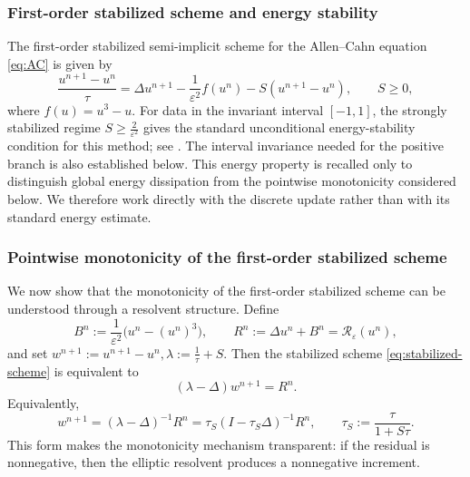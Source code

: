 \documentclass[final, 3p, times]{elsarticle}%
\newcommand{\eps}{\varepsilon}
\newcommand{\Reps}{\mathcal R_\varepsilon}
\begin{document}
\subsubsection{First-order stabilized scheme and energy stability}

The first-order stabilized semi-implicit scheme for the Allen--Cahn equation \eqref{eq:AC} is given by
\begin{equation}
    \frac{u^{n+1}-u^n}{\tau}
    =\Delta u^{n+1}
    -\frac1{\eps^2}f(u^n)
    -S(u^{n+1}-u^n),
    \qquad S\ge0,
    \label{eq:stabilized-scheme}
\end{equation}
where \(f(u)=u^3-u\). For data in the invariant interval \([-1,1]\), the strongly stabilized regime
$S\ge \frac{2}{\eps^2}$
gives the standard unconditional energy-stability condition for this method; see
\cite{tangqiao2020phasefield,tangyang2016imex}. The interval invariance needed
for the positive branch is also established below.
This energy property is recalled only to distinguish global energy dissipation from the pointwise
monotonicity considered below. We therefore work directly with the discrete update rather than
with its standard energy estimate.


\subsubsection{Pointwise monotonicity of the first-order stabilized scheme}
We now show that the monotonicity of the first-order stabilized scheme can be understood through a resolvent structure. Define
\begin{equation}
    B^n:=\frac1{\eps^2}\bigl(u^n-(u^n)^3\bigr),
    \qquad
    R^n:=\Delta u^n+B^n=\Reps(u^n),
    \label{eq:stabilized-B-R}
\end{equation}
and set
$w^{n+1}:=u^{n+1}-u^n,
    \lambda:=\frac1\tau+S .$
Then the stabilized scheme \eqref{eq:stabilized-scheme} is equivalent to
\begin{equation}
    (\lambda-\Delta)w^{n+1}=R^n .
    \label{eq:stabilized-increment-equation}
\end{equation}
Equivalently,
\begin{equation}
    w^{n+1} =
    (\lambda-\Delta)^{-1}R^n
    =
    \tau_S(I-\tau_S\Delta)^{-1}R^n,
    \qquad
    \tau_S:=\frac{\tau}{1+S\tau}.
    \label{eq:stabilized-resolvent-form}
\end{equation}
This form makes the monotonicity mechanism transparent: if the residual is nonnegative, then the elliptic resolvent produces a nonnegative increment.
\end{document}
